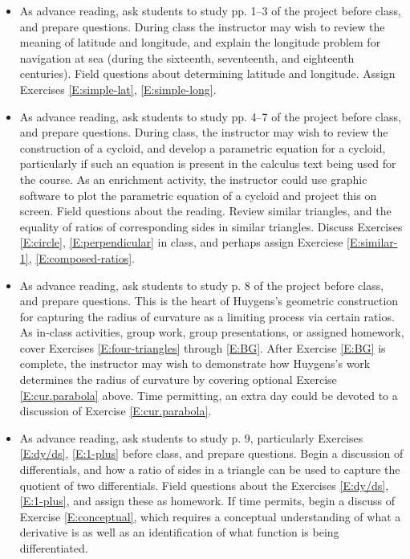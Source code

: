 \documentclass[12pt]{article}
\theoremstyle{definition}
\begin{document}
\begin{itemize}
\item[{\bf{Day 1.}}]  As advance reading, ask students to study pp. 1--3 of the project before class, 
and prepare questions.  
During class the instructor may wish to review the meaning of latitude and longitude, and explain
the longitude problem for navigation at sea (during the sixteenth, seventeenth, and eighteenth centuries).  
Field questions about determining latitude and longitude.  Assign Exercises \eqref{E:simple-lat},
\eqref{E:simple-long}.  

\item[{\bf{Day 2.}}]  As advance reading, ask students to study pp. 4--7 of the project before class,
and prepare questions.  During class, the instructor may wish to review the construction of a
cycloid, and develop a parametric equation for a cycloid, particularly if such an equation is present 
in the calculus text being used for the course.   As an enrichment activity, the instructor could use graphic
software to plot the parametric equation of a cycloid and project this on screen.  Field questions about
the reading.  Review similar triangles,
and the equality of ratios of corresponding sides in similar triangles.  Discuss Exercises \eqref{E:circle},
\eqref{E:perpendicular} in class, and perhaps assign Exerciese \eqref{E:similar-1}, \eqref{E:composed-ratios}.

\item[{\bf{Day 3.}}]  As advance reading, ask students to study p. 8 of the project before class,
and prepare questions.  This is the heart of Huygens's geometric construction for capturing the radius of
curvature as a limiting process via certain ratios.  As in-class activities, group work, group presentations,
or assigned homework, cover Exercises \eqref{E:four-triangles} through \eqref{E:BG}.  After Exercise \eqref{E:BG}
is complete, the instructor may wish to demonstrate how Huygens's work determines the radius of curvature
by covering optional Exercise \eqref{E:cur.parabola} above.  Time permitting, an extra day could be devoted to
a discussion of Exercise \eqref{E:cur.parabola}.  

\item[{\bf{Day 4.}}]  As advance reading, ask students to study p. 9, particularly Exercises \eqref{E:dy/ds},
\eqref{E:1-plus} before class, and prepare questions.  Begin a discussion of differentials, and how a ratio of 
sides in a triangle can be used to capture the quotient of two differentials.  Field questions about the Exercises
\eqref{E:dy/ds}, \eqref{E:1-plus}, and assign these as homework.  If time permits, begin a discuss of
Exercise \eqref{E:conceptual}, which requires a conceptual understanding of what a derivative is as well as an 
identification of what function is being differentiated.    


\end{itemize}
\end{document}
